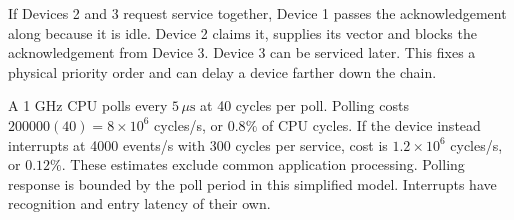 \documentclass[12pt,a4paper]{article}
\begin{document}
\begin{tcolorbox}[tikzbox,title={Daisy-chained interrupt acknowledgement},unbreakable]
\centering
{}
\end{tcolorbox}

If Devices 2 and 3 request service together, Device 1 passes the acknowledgement along because it is idle. Device 2 claims it, supplies its vector and blocks the acknowledgement from Device 3. Device 3 can be serviced later. This fixes a physical priority order and can delay a device farther down the chain.

\begin{tcolorbox}[examplebox,title={Compare polling overhead with interrupt overhead}]
A 1 GHz CPU polls every $5\,\mu\mathrm s$ at 40 cycles per poll. Polling costs $200000(40)=8\times10^6$ cycles/s, or $0.8\%$ of CPU cycles. If the device instead interrupts at 4000 events/s with 300 cycles per service, cost is $1.2\times10^6$ cycles/s, or $0.12\%$. These estimates exclude common application processing. Polling response is bounded by the poll period in this simplified model. Interrupts have recognition and entry latency of their own.
\end{tcolorbox}
\end{document}
